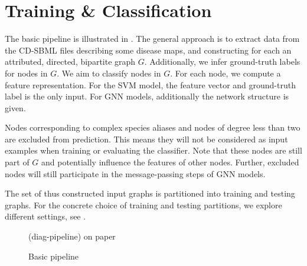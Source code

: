 \documentclass[
	fontsize=10pt, %
	twoside=false, %
	secnumdepth=1, %
]{kaobook}
\begin{document}
\section{Training \& Classification}
\label{sec:classification}

The basic pipeline is illustrated in . The general
approach is to extract data from the CD-SBML files describing some disease maps,
and constructing for each an attributed, directed, bipartite graph $G$.
Additionally, we infer ground-truth labels for nodes in $G$.
We aim to classify nodes in $G$. For each node, we compute a feature
representation. For the SVM model, the feature vector and ground-truth label is
the only input. For GNN models, additionally the network structure is given.

Nodes corresponding to complex species aliases and nodes of degree less than two
are excluded from prediction. This means they will not be considered as input
examples when training or evaluating the classifier. Note that these nodes are
still part of $G$ and potentially influence the features of other nodes.
Further, excluded nodes will still participate in the message-passing steps of
GNN models.

The set of thus constructed input graphs is partitioned into training and
testing graphs. For the concrete choice of training and testing partitions, we
explore different settings, see .

\begin{figure}[h]
  \centering
  (diag-pipeline) on paper
  \caption{Basic pipeline}
  \label{fig:diag-pipeline}
\end{figure}




\end{document}
